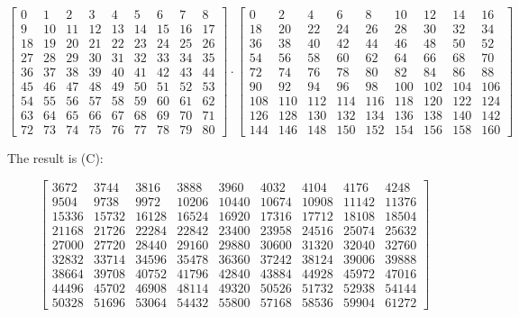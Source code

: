 \documentclass[11pt]{article}
\begin{document}
\[
 \left[
 \begin{matrix}
    0 & 1 & 2 & 3 & 4 & 5 & 6 & 7 & 8 \\
    9 & 10 & 11 & 12 & 13 & 14 & 15 & 16 & 17 \\ 
    18 & 19 & 20 & 21 & 22 & 23 & 24 & 25 & 26 \\
    27 & 28 & 29 & 30 & 31 & 32 & 33 & 34 & 35 \\
    36 & 37 & 38 & 39 & 40 & 41 & 42 & 43 & 44 \\
    45 & 46 & 47 & 48 & 49 & 50 & 51 & 52 & 53 \\
    54 & 55 & 56 & 57 & 58 & 59 & 60 & 61 & 62 \\
    63 & 64 & 65 & 66 & 67 & 68 & 69 & 70 & 71 \\
    72 & 73 & 74 & 75 & 76 & 77 & 78 & 79 & 80 
  \end{matrix}
  \right]
  \cdot
 \left[
 \begin{matrix}
    0 & 2 & 4 & 6 & 8 & 10 & 12 & 14 & 16 \\
    18 & 20 & 22 & 24 & 26 & 28 & 30 & 32 & 34 \\ 
    36 & 38 & 40 & 42 & 44 & 46 & 48 & 50 & 52 \\
    54 & 56 & 58 & 60 & 62 & 64 & 66 & 68 & 70 \\
    72 & 74 & 76 & 78 & 80 & 82 & 84 & 86 & 88 \\
    90 & 92 & 94 & 96 & 98 & 100 & 102 & 104 & 106 \\
    108 & 110 & 112 & 114 & 116 & 118 & 120 & 122 & 124 \\
    126 & 128 & 130 & 132 & 134 & 136 & 138 & 140 & 142 \\
    144 & 146 & 148 & 150 & 152 & 154 & 156 & 158 & 160 
  \end{matrix}
  \right]
\]

The result is (C):

\[
 \left[
 \begin{matrix}
    3672 & 3744 & 3816 & 3888 & 3960 & 4032 & 4104 & 4176 & 4248 \\
    9504 & 9738 & 9972 & 10206 & 10440 & 10674 & 10908 & 11142 & 11376 \\
    15336 & 15732 & 16128 & 16524 & 16920 & 17316 & 17712 & 18108 & 18504 \\
    21168 & 21726 & 22284 & 22842 & 23400 & 23958 & 24516 & 25074 & 25632 \\
    27000 & 27720 & 28440 & 29160 & 29880 & 30600 & 31320 & 32040 & 32760 \\
    32832 & 33714 & 34596 & 35478 & 36360 & 37242 & 38124 & 39006 & 39888 \\
    38664 & 39708 & 40752 & 41796 & 42840 & 43884 & 44928 & 45972 & 47016 \\
    44496 & 45702 & 46908 & 48114 & 49320 & 50526 & 51732 & 52938 & 54144 \\
    50328 & 51696 & 53064 & 54432 & 55800 & 57168 & 58536 & 59904 & 61272
  \end{matrix}
  \right]
\]
\end{document}
